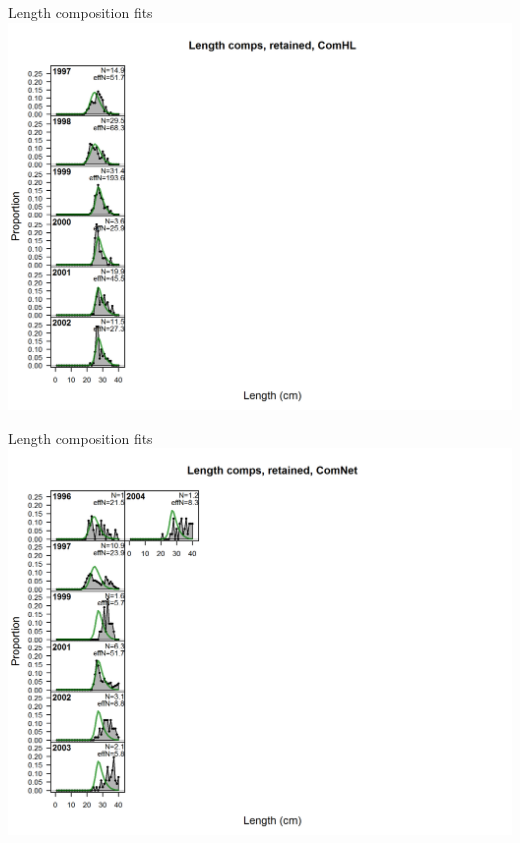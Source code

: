 \documentclass[ignorenonframetext,]{beamer}
\begin{document}
\begin{frame}{Length composition fits}\includegraphics{./r4ss/plots_mod1/comp_lenfit_flt1mkt2.png}\end{frame}

\begin{frame}{Length composition fits}\includegraphics{./r4ss/plots_mod1/comp_lenfit_flt2mkt2.png}\end{frame}
\end{document}
